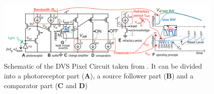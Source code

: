 
\begin{figure}
    \centering
    \includegraphics[width=\linewidth]{resources/images/intensity-estimation/DVSCircuit.png}
    \caption[Schematic of the DVS Pixel Circuit]{Schematic of the DVS Pixel Circuit taken from \cite{DVSBiases2023}. It can be divided into a photoreceptor part (\textbf{A}), a source follower part (\textbf{B}) and a comparator part (\textbf{C} and \textbf{D})}
    \label{fig:eventCircuit}
\end{figure}

